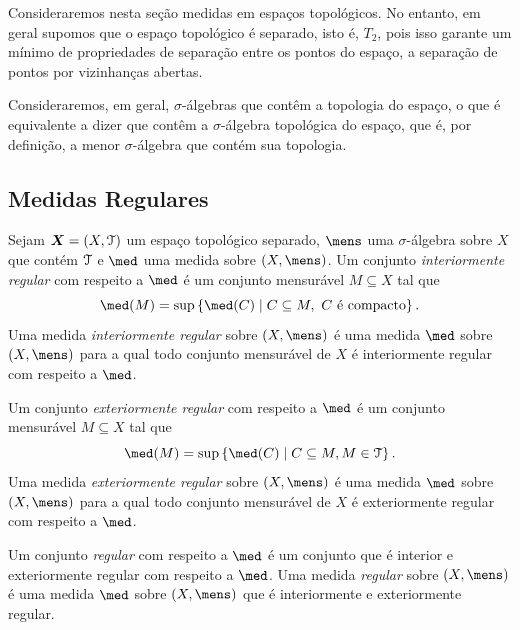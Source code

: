 Consideraremos nesta seção medidas em espaços topológicos. No entanto, em geral supomos que o espaço topológico é separado, isto é, $T_2$, pois isso garante um mínimo de propriedades de separação entre os pontos do espaço, a separação de pontos por vizinhanças abertas.

Consideraremos, em geral, $\sigma$-álgebras que contêm a topologia do espaço, o que é equivalente a dizer que contêm a $\sigma$-álgebra topológica do espaço, que é, por definição, a menor $\sigma$-álgebra que contém sua topologia.

\subsection{Medidas Regulares}

\begin{defi}
Sejam $\bm X = (X,\mathcal{T})$ um espaço topológico separado, $\mens$ uma $\sigma$-álgebra sobre $X$ que contém $\mathcal{T}$ e $\med$ uma medida sobre $(X,\mens)$. Um conjunto \emph{interiormente regular} com respeito a $\med$ é um conjunto mensurável $M \subseteq X$ tal que
	\begin{equation*}
	\med(M) = \sup\set{\med(C)}{C \subseteq M,\text{ $C$ é compacto}}.
	\end{equation*}
Uma medida \emph{interiormente regular} sobre $(X,\mens)$ é uma medida $\med$ sobre $(X,\mens)$ para a qual todo conjunto mensurável de $X$ é interiormente regular com respeito a $\med$.

Um conjunto \emph{exteriormente regular} com respeito a $\med$ é um conjunto mensurável $M \subseteq X$ tal que
	\begin{equation*}
	\med(M) = \sup\set{\med(C)}{C \subseteq M, M \in \topo}.
	\end{equation*}
Uma medida \emph{exteriormente regular} sobre $(X,\mens)$ é uma medida $\med$ sobre $(X,\mens)$ para a qual todo conjunto mensurável de $X$ é exteriormente regular com respeito a $\med$.

Um conjunto \emph{regular} com respeito a $\med$ é um conjunto que é interior e exteriormente regular com respeito a $\med$. Uma medida \emph{regular} sobre $(X,\mens)$ é uma medida $\med$ sobre $(X,\mens)$ que é interiormente e exteriormente regular.
\end{defi}


